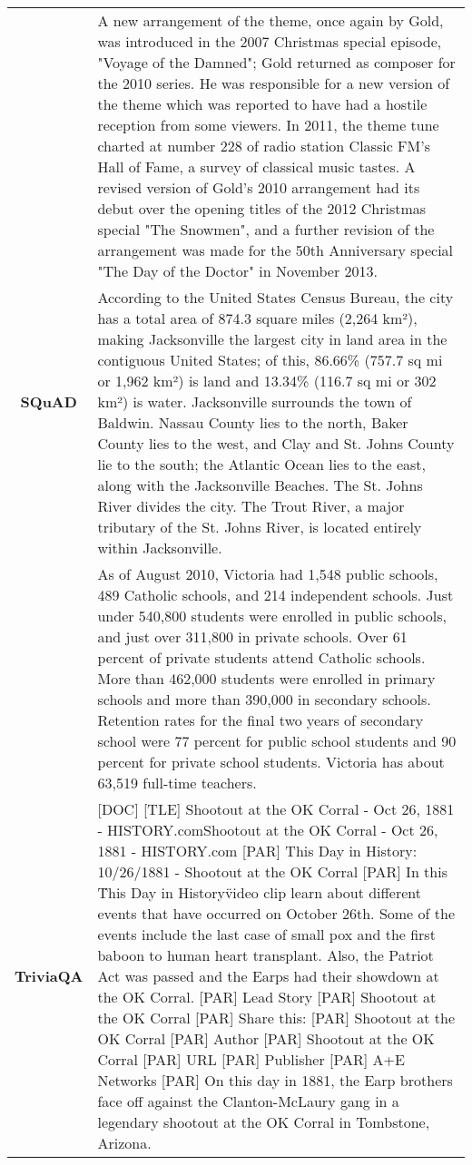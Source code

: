 \begin{table*}[h]
    \centering
    \small
    
    \begin{tabularx}{\textwidth}{|c|X|}
        \hline
        \multirow{3}{*}{\textbf{SQuAD}} & A new arrangement of the theme, once again by Gold, was introduced in the 2007 Christmas special episode, "Voyage of the Damned"; Gold returned as composer for the 2010 series. He was responsible for a new version of the theme which was reported to have had a hostile reception from some viewers. In 2011, the theme tune charted at number 228 of radio station Classic FM's Hall of Fame, a survey of classical music tastes. A revised version of Gold's 2010 arrangement had its debut over the opening titles of the 2012 Christmas special "The Snowmen", and a further revision of the arrangement was made for the 50th Anniversary special "The Day of the Doctor" in November 2013. \\ 
        \cline{2-2}
        & According to the United States Census Bureau, the city has a total area of 874.3 square miles (2,264 km²), making Jacksonville the largest city in land area in the contiguous United States; of this, 86.66\% (757.7 sq mi or 1,962 km²) is land and 13.34\% (116.7 sq mi or 302 km²) is water. Jacksonville surrounds the town of Baldwin. Nassau County lies to the north, Baker County lies to the west, and Clay and St. Johns County lie to the south; the Atlantic Ocean lies to the east, along with the Jacksonville Beaches. The St. Johns River divides the city. The Trout River, a major tributary of the St. Johns River, is located entirely within Jacksonville. \\
        \cline{2-2}
        & As of August 2010, Victoria had 1,548 public schools, 489 Catholic schools, and 214 independent schools. Just under 540,800 students were enrolled in public schools, and just over 311,800 in private schools. Over 61 percent of private students attend Catholic schools. More than 462,000 students were enrolled in primary schools and more than 390,000 in secondary schools. Retention rates for the final two years of secondary school were 77 percent for public school students and 90 percent for private school students. Victoria has about 63,519 full-time teachers.  \\
        \hline
        \multirow{3}{*}{\textbf{TriviaQA}} & [DOC] [TLE] Shootout at the OK Corral - Oct 26, 1881 - HISTORY.comShootout at the OK Corral - Oct 26, 1881 - HISTORY.com [PAR] This Day in History: 10/26/1881 - Shootout at the OK Corral [PAR] In this \"This Day in History\" video clip learn about different events that have occurred on October 26th. Some of the events include the last case of small pox and the first baboon to human heart transplant. Also, the Patriot Act was passed and the Earps had their showdown at the OK Corral. [PAR] Lead Story [PAR] Shootout at the OK Corral [PAR] Share this: [PAR] Shootout at the OK Corral [PAR] Author [PAR] Shootout at the OK Corral [PAR] URL [PAR] Publisher [PAR] A+E Networks [PAR] On this day in 1881, the Earp brothers face off against the Clanton-McLaury gang in a legendary shootout at the OK Corral in Tombstone, Arizona. \\ 

\end{tabularx}
\end{table*}
